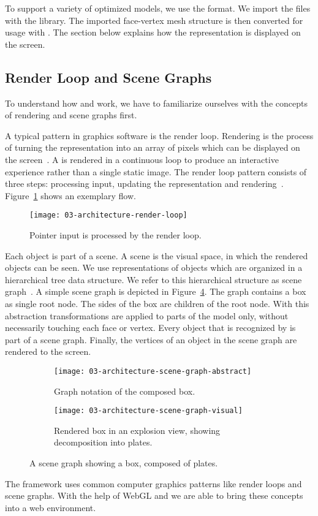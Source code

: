 \documentclass[../../ClassicThesis.tex]{subfiles}
\begin{document}
To support a variety of {\threedprinter} optimized models,
we use the {\stlfile} format. We import the files with the
{\meshlib} library. The imported face-vertex mesh structure
is then converted for usage with {\threejs}. The section
below explains how the {\threejs} representation is
displayed on the screen.

\subsection{Render Loop and Scene Graphs}
\label{sub:render-and-graph}

To understand how {\convertify} and {\platener} work, we
have to familiarize ourselves with the concepts of rendering
and scene graphs first.

A typical pattern in graphics software is the render loop.
Rendering is the process of turning the {\threedmodel}
representation into an array of pixels which can be
displayed on the screen~\cite[p.~2]{intro-cg}. A
{\threedmodel} is rendered in a continuous loop to produce
an interactive experience rather than a single static image.
The render loop pattern consists of three steps: processing
input, updating the {\threedmodel} representation and
rendering~\cite{gamedev-gameloop}.
Figure~\ref{fig:render-loop} shows an exemplary flow.

\begin{figure}[h]
  \centering
  \texttt{[image: 03-architecture-render-loop]}
  \caption{Pointer input is processed by the render loop.}
  \label{fig:render-loop}
\end{figure}

Each object is part of a scene. A scene is the visual space,
in which the rendered objects can be seen. We use
representations of objects which are organized in a
hierarchical tree data structure. We refer to this
hierarchical structure as scene graph~\cite{scene-graph}. A
simple scene graph is depicted in
Figure~\ref{fig:scene-graph}. The graph contains a box as
single root node. The sides of the box are children of the
root node. With this abstraction transformations are applied
to parts of the model only, without necessarily touching
each face or vertex. Every object that is recognized by
{\convertify} is part of a scene graph. Finally, the
vertices of an object in the scene graph are rendered to the
screen.

\begin{figure}[H]
  \centering
  \begin{subfigure}[b]{0.49\textwidth}
    \centering
    \texttt{[image: 03-architecture-scene-graph-abstract]}
    \caption{Graph notation of the composed box.}
    \label{fig:scene-graph:abstract}
  \end{subfigure}
  \begin{subfigure}[b]{0.49\textwidth}
    \centering
    \texttt{[image: 03-architecture-scene-graph-visual]}
    \caption{Rendered box in an explosion view, showing decomposition into plates.}
    \label{fig:scene-graph:visual}
  \end{subfigure}
  \caption{A scene graph showing a box, composed of plates.}
  \label{fig:scene-graph}
\end{figure}


The framework {\convertify} uses common computer graphics
patterns like render loops and scene graphs. With the help
of WebGL and {\threejs} we are able to bring these concepts
into a web environment.
\end{document}
